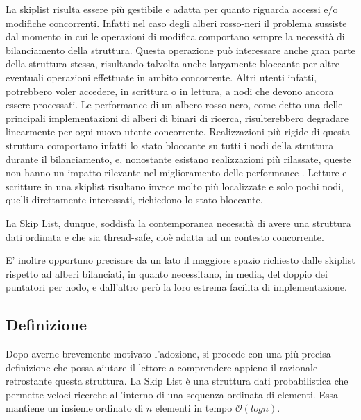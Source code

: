 	La skiplist risulta essere più gestibile e adatta per quanto riguarda accessi e/o modifiche concorrenti. Infatti nel caso degli alberi rosso-neri il problema sussiste dal momento in cui le operazioni di modifica comportano sempre la necessità di bilanciamento della struttura. Questa operazione può interessare anche gran parte della struttura stessa, risultando talvolta anche largamente bloccante per altre eventuali operazioni effettuate in ambito concorrente. Altri utenti infatti, potrebbero voler accedere, in scrittura o in lettura, a nodi che devono ancora essere processati. Le performance di un albero rosso-nero, come detto una delle principali implementazioni di alberi di binari di ricerca, risulterebbero degradare linearmente per ogni nuovo utente concorrente. Realizzazioni più rigide di questa struttura comportano infatti lo stato bloccante su tutti i nodi della struttura durante il bilanciamento, e, nonostante esistano realizzazioni più rilassate, queste non hanno un impatto rilevante nel miglioramento delle performance \cite{blocking_datastructures}.
	Letture e scritture in una skiplist risultano invece molto più localizzate e solo pochi nodi, quelli direttamente interessati, richiedono lo stato bloccante.
	
	La Skip List, dunque, soddisfa la contemporanea necessità di avere una struttura dati ordinata e che sia thread-safe, cioè adatta ad un contesto concorrente.
	
	E' inoltre opportuno precisare da un lato il maggiore spazio richiesto dalle skiplist rispetto ad alberi bilanciati, in quanto necessitano, in media, del doppio dei puntatori per nodo, e dall'altro però la loro estrema facilita di implementazione.
	
	\subsection{Definizione}
	
%		

	Dopo averne brevemente motivato l'adozione, si procede con una più precisa definizione che possa aiutare il lettore a comprendere appieno il razionale retrostante questa struttura. 
	La Skip List è una struttura dati probabilistica che permette veloci ricerche all'interno di una sequenza ordinata di elementi. Essa mantiene un insieme ordinato di $ n $ elementi in tempo $\mathcal{O}(log{}n)$.
	
